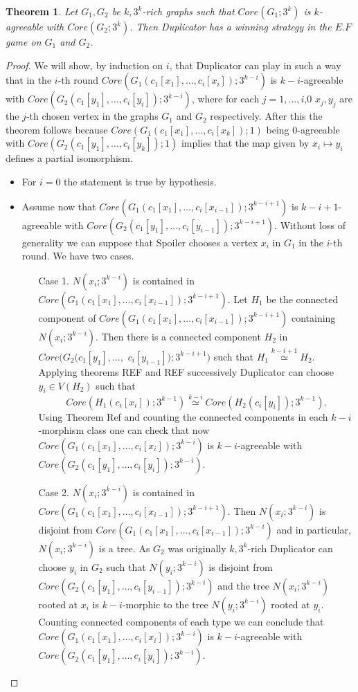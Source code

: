 \documentclass[11pt,notitlepage]{report}
\newtheorem{theorem}{Theorem}[chapter]
\theoremstyle{definition}
\newcommand{\morph}[1]{\stackrel{#1}{\simeq}}
\begin{document}
\begin{theorem} 
	Let $G_1, G_2$ be $k,3^k$-rich graphs such that $Core(G_1;3^k)$ is $k$-agreeable
	with $Core(G_2;3^k)$. Then Duplicator has a winning strategy in 
	the $E.F$ game on $G_1$ and $G_2$. 
\end{theorem}
\begin{proof}
	We will show, by induction on $i$, that Duplicator can play in such a way
	that in the $i$-th round $Core(G_1(c_1[x_1],\dots,c_i[x_i]);3^{k-i})$
	is $k-i$-agreeable with  $Core(G_2(c_1[y_1],\dots,c_i[y_i]);3^{k-i})$,
	where for each $j=1,\dots,i$,0 $x_j,y_j$ are the $j$-th 
	chosen vertex in the graphs $G_1$ and $G_2$	respectively. After this the theorem
	follows because
	$Core(G_1(c_1[x_1],\dots,c_i[x_k]);1)$ being $0$-agreeable with
	$Core(G_2(c_1[y_1],\dots,c_i[y_k]);1)$ implies that
	the map given by $x_i\mapsto y_i$ defines a partial isomorphism. \par
	\begin{itemize}[leftmargin=*]
		\item For $i=0$ the statement is true by hypothesis. 
		\item Assume now that $Core(G_1(c_1[x_1],\dots,c_i[x_{i-1}]);3^{k-i+1})$
		is $k-i+1$-agreeable with $Core(G_2(c_1[y_1],\dots, c_i[y_{i-1}]); 3^{k-i+1})$.
		Without loss of generality we can suppose that Spoiler chooses a vertex 
		$x_i$ in $G_1$ in the $i$-th round. We have two cases.
		\begin{itemize}[leftmargin=*]
			\item[Case 1.] $N(x_i;3^{k-i})$ is contained in 
			$Core(G_1(c_1[x_1],\dots,c_i[x_{i-1}]);3^{k-i+1})$.
			Let $H_1$ be the connected component of $Core(G_1(c_1[x_1],\dots,c_i[x_{i-1}]);3^{k-i+1})$
			containing $N(x_i;3^{k-i})$. Then there is a connected component $H_2$
			in $Core(G_2(c_1[y_1],\dots,$ $c_i[y_{i-1}]);3^{k-i+1})$ such that
			$H_1 \morph{k-i+1} H_2$. Applying theorems REF and REF successively Duplicator can choose
			$y_i\in V(H_2)$ such that 
			\[ Core(H_1(c_i[x_i]); 3^{k-1})\morph{k-i} Core(H_2(c_i[y_i]); 3^{k-1}).\]
			Using Theorem Ref and counting the connected components in each $k-i$-morphism class
			one can check that now $Core(G_1(c_1[x_1],\dots,c_i[x_i]);3^{k-i})$
			is $k-i$-agreeable with  $Core(G_2(c_1[y_1],\dots,c_i[y_i]);3^{k-i})$.
			\item[Case 2.] $N(x_i;3^{k-i})$ is contained in 
			$Core(G_1(c_1[x_1],\dots,c_i[x_{i-1}]);3^{k-i+1})$. Then
			$N(x_i;3^{k-i})$ is disjoint from $Core(G_1(c_1[x_1],\dots,c_i[x_{i-1}]);3^{k-i})$
			and in particular, $N(x_i;3^{k-i})$ is a tree. As $G_2$ was originally $k,3^k$-rich
			Duplicator can choose $y_i$ in $G_2$ such that $N(y_i;3^{k-i})$ is disjoint from 
			$Core(G_2(c_1[y_1],\dots,c_i[y_{i-1}]);3^{k-i})$ and the tree $N(x_i;3^{k-i})$
			rooted at $x_i$ is $k-i$-morphic to the tree $N(y_i;3^{k-i})$ rooted at $y_i$.
			Counting connected components of each type we can conclude that
			$Core(G_1(c_1[x_1],\dots,c_i[x_i]);3^{k-i})$
			is $k-i$-agreeable with  $Core(G_2(c_1[y_1],\dots,c_i[y_i]);3^{k-i})$.
		\end{itemize}  		
	\end{itemize}
	
\end{proof}
\end{document}
